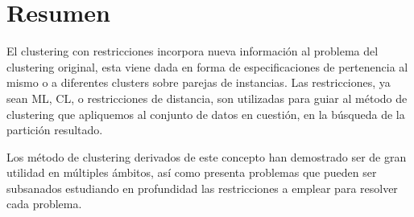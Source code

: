 \section{Resumen}

El clustering con restricciones incorpora nueva información al problema del clustering original, esta viene dada en forma de especificaciones de pertenencia al mismo o a diferentes clusters sobre parejas de instancias. Las restricciones, ya sean \acf{ML}, \acf{CL}, o restricciones de distancia, son utilizadas para guiar al método de clustering que apliquemos al conjunto de datos en cuestión, en la búsqueda de la partición resultado.

Los método de clustering derivados de este concepto han demostrado ser de gran utilidad en múltiples ámbitos, así como presenta problemas que pueden ser subsanados estudiando en profundidad las restricciones a emplear para resolver cada problema.


































